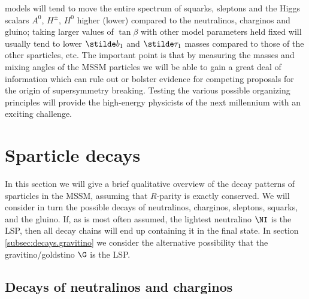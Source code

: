 models
will tend to move the entire spectrum of squarks, sleptons and the
Higgs
scalars $A^0$, $H^\pm$, $H^0$ higher (lower) compared to the neutralinos,
charginos and gluino; taking larger values of $\tan\beta$ with other
model parameters held fixed will usually tend to lower
$\stilde b_1$ and $\stilde \tau_1$ masses compared to those of the other
sparticles, etc.
The important point is that by measuring the masses and mixing
angles of the MSSM
particles we will be able to gain a great deal of information
which can rule out or bolster evidence
for competing proposals for the origin of supersymmetry breaking.
Testing the various possible organizing
principles will provide the high-energy physicists of the next millennium
with an exciting challenge.


\section{Sparticle decays}\label{sec:decays}
\setcounter{equation}{0}
\setcounter{footnote}{1}

In this section we will give a brief qualitative overview of the
decay patterns of sparticles in the MSSM, assuming that $R$-parity
is exactly conserved. We will
consider in turn the possible decays of neutralinos, charginos,
sleptons, squarks, and the gluino. If, as is most often assumed, the
lightest
neutralino
$\NI$ is the LSP, then all decay chains will end up containing it
in the final state. In section \ref{subsec:decays.gravitino} we
consider the alternative
possibility that the gravitino/goldstino $\G$ is the LSP.

\subsection{Decays of neutralinos and
charginos}\label{subsec:decays.inos}


